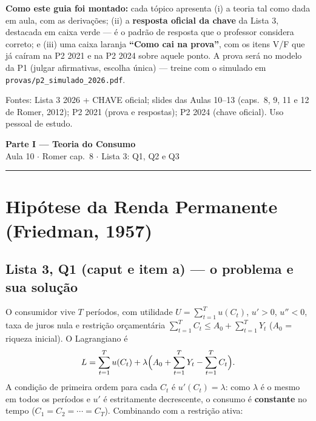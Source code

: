 \documentclass[12pt, a4paper]{article}
\begin{document}
\begin{titlepage}
\begin{center}
\vspace{1.2em}
\begin{tcolorbox}[standard, colback=boxbg, colframe=boxborder, width=0.92\textwidth,
  arc=4pt, boxrule=1pt, left=8pt, right=8pt, top=6pt, bottom=6pt]
\raggedright
\textbf{Como este guia foi montado:} cada tópico apresenta (i) a teoria tal
como dada em aula, com as derivações; (ii) a \textbf{resposta oficial da
chave} da Lista 3, destacada em caixa verde --- é o padrão de resposta que o
professor considera correto; e (iii) uma caixa laranja \textbf{``Como cai na
prova''}, com os itens V/F que já caíram na P2 2021 e na P2 2024 sobre aquele
ponto. A prova será no modelo da P1 (julgar afirmativas, escolha única) ---
treine com o simulado em \texttt{provas/p2\_simulado\_2026.pdf}.
\end{tcolorbox}

\vfill
{\small Fontes: Lista 3 2026 + CHAVE oficial; slides das Aulas 10--13
(caps.\ 8, 9, 11 e 12 de Romer, 2012); P2 2021 (prova e respostas);
P2 2024 (chave oficial). Uso pessoal de estudo.}
\end{center}
\end{titlepage}

\begin{center}
{\LARGE\bfseries\color{orangerbc} Parte I --- Teoria do Consumo}\\[0.2em]
{\normalsize\color{grayrbc} Aula 10 $\cdot$ Romer cap.\ 8 $\cdot$ Lista 3: Q1, Q2 e Q3}\\[0.2em]
\rule{\linewidth}{0.8pt}
\end{center}

\section{Hipótese da Renda Permanente (Friedman, 1957)}

\subsection{Lista 3, Q1 (caput e item a) --- o problema e sua solução}

O consumidor vive $T$ períodos, com utilidade
$U = \sum_{t=1}^{T} u(C_t)$, $u'>0$, $u''<0$, taxa de juros nula e restrição
orçamentária $\sum_{t=1}^{T} C_t \leq A_0 + \sum_{t=1}^{T} Y_t$
($A_0$ = riqueza inicial). O Lagrangiano é
\[
L = \sum_{t=1}^{T} u(C_t)
  + \lambda\Bigl(A_0 + \sum_{t=1}^{T} Y_t - \sum_{t=1}^{T} C_t\Bigr).
\]
A condição de primeira ordem para cada $C_t$ é $u'(C_t) = \lambda$: como
$\lambda$ é o mesmo em todos os períodos e $u'$ é estritamente decrescente, o
consumo é \textbf{constante} no tempo ($C_1 = C_2 = \cdots = C_T$).
Combinando com a restrição ativa:
\end{document}
